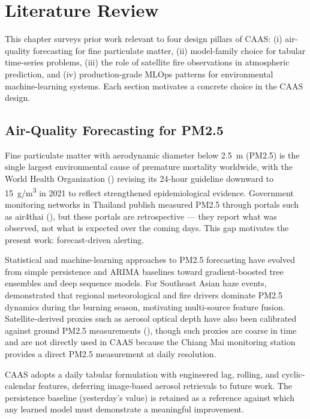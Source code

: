 \chapter{Literature Review}
\label{ch:literature-review}

This chapter surveys prior work relevant to four design pillars of CAAS:
(i) air-quality forecasting for fine particulate matter, (ii) model-family
choice for tabular time-series problems, (iii) the role of satellite fire
observations in atmospheric prediction, and (iv) production-grade MLOps
patterns for environmental machine-learning systems. Each section motivates
a concrete choice in the CAAS design.

\section{Air-Quality Forecasting for PM2.5}

Fine particulate matter with aerodynamic diameter below 2.5~\textmu m
(PM2.5) is the single largest environmental cause of premature mortality
worldwide, with the World Health Organization (\cite{who2021}) revising its
24-hour guideline downward to 15~\textmu g/m\textsuperscript{3} in 2021 to
reflect strengthened epidemiological evidence. Government monitoring networks
in Thailand publish measured PM2.5 through portals such as air4thai
(\cite{pcd}), but these portals are retrospective --- they report what was
observed, not what is expected over the coming days. This gap motivates the
present work: forecast-driven alerting.

Statistical and machine-learning approaches to PM2.5 forecasting have
evolved from simple persistence and ARIMA baselines toward gradient-boosted
tree ensembles and deep sequence models. For Southeast Asian haze events,
\cite{chaing_mai_haze} demonstrated that regional meteorological and fire
drivers dominate PM2.5 dynamics during the burning season, motivating
multi-source feature fusion. Satellite-derived proxies such as aerosol
optical depth have also been calibrated against ground PM2.5 measurements
(\cite{psi}), though such proxies are coarse in time and are not directly
used in CAAS because the Chiang Mai monitoring station provides a direct
PM2.5 measurement at daily resolution.

CAAS adopts a daily tabular formulation with engineered lag, rolling, and
cyclic-calendar features, deferring image-based aerosol retrievals to future
work. The persistence baseline (yesterday's value) is retained as a
reference against which any learned model must demonstrate a meaningful
improvement.

